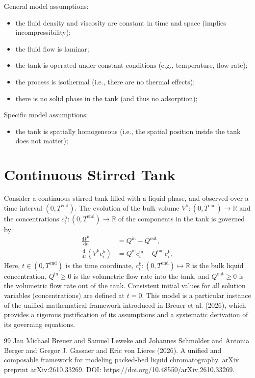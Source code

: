 \documentclass{article}
\begin{document}
General model assumptions:
\begin{itemize}
    \item the fluid density and viscosity are constant in time and space (implies incompressibility);
    \item the fluid flow is laminar;
    \item the tank is operated under constant conditions (e.g., temperature, flow rate);
    \item the process is isothermal (i.e., there are no thermal effects);
    \item there is no solid phase in the tank (and thus no adsorption);
\end{itemize}

Specific model assumptions:
\begin{itemize}
    \item the tank is spatially homogeneous (i.e., the spatial position inside the tank does not matter);
\end{itemize}

\section*{Continuous Stirred Tank}
Consider a continuous stirred tank filled with a liquid phase, and observed over a time interval $(0, T^{\mathrm{end}})$.
The evolution of the bulk volume $V^{\mathrm{b}}\colon (0, T^{\mathrm{end}}) \to \mathbb{R}$ and the concentrations $c^{\mathrm{b}}_{i}\colon (0, T^{\mathrm{end}}) \to \mathbb{R}$ of the components in the tank is governed by
\begin{align}
    \frac{\mathrm{d}V^{\mathrm{b}}}{\mathrm{d}t}
    &= Q^{\mathrm{in}}
        - Q^{\mathrm{out}},
    \\
    \frac{\mathrm{d}}{\mathrm{d} t} \left( V^{\mathrm{b}} c^{\mathrm{b}}_{i} \right)
    &= Q^{\mathrm{in}} c^{\mathrm{in}}_{i}
        - Q^{\mathrm{out}} c^{\mathrm{b}}_{i},
\end{align}
Here, $t\in (0, T^{\mathrm{end}})$ is the time coordinate, $c^{\mathrm{b}}_{i}\colon (0, T^{\mathrm{end}}) \mapsto \mathbb{R}$ is the bulk liquid concentration, $Q^{\mathrm{in}}\geq 0$ is the volumetric flow rate into the tank, and $Q^{\mathrm{out}}\geq 0$ is the volumetric flow rate out of the tank.
Consistent initial values for all solution variables (concentrations) are defined at $t = 0$.
This model is a particular instance of the unified mathematical framework introduced in Breuer et al. (2026), which provides a rigorous justification of its assumptions and a systematic derivation of its governing equations.
\begin{thebibliography}{99}
     Jan Michael Breuer and Samuel Leweke and Johannes Schmölder and Antonia Berger and Gregor J. Gassner and Eric von Lieres (2026). A unified and composable framework for modeling packed-bed liquid chromatography. arXiv preprint arXiv:2610.33269. DOI: https://doi.org/10.48550/arXiv.2610.33269.
\end{thebibliography}
\end{document}
